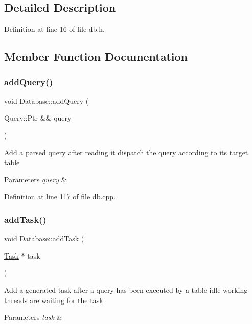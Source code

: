 \subsection{Detailed Description}


Definition at line 16 of file db.\+h.



\subsection{Member Function Documentation}
\mbox{\label{class_database_a537758fac6907e4d0f5e136a5c894a3d}} 
\subsubsection{\texorpdfstring{add\+Query()}{addQuery()}}
{\footnotesize\ttfamily void Database\+::add\+Query (\begin{DoxyParamCaption}\item[{Query\+::\+Ptr \&\&}]{query }\end{DoxyParamCaption})}

Add a parsed query after reading it dispatch the query according to its target table 
\begin{DoxyParams}{Parameters}
{\em query} & \\
\hline
\end{DoxyParams}


Definition at line 117 of file db.\+cpp.

\mbox{\label{class_database_a49110ec81b4011c47011ef3b0a348a70}} 
\subsubsection{\texorpdfstring{add\+Task()}{addTask()}}
{\footnotesize\ttfamily void Database\+::add\+Task (\begin{DoxyParamCaption}\item[{\hyperlink{class_task}{Task} $\ast$}]{task }\end{DoxyParamCaption})}

Add a generated task after a query has been executed by a table idle working threads are waiting for the task 
\begin{DoxyParams}{Parameters}
{\em task} & \\
\hline
\end{DoxyParams}



